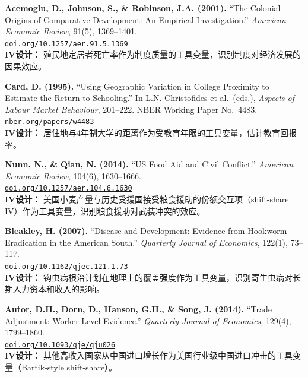 \documentclass[12pt, a4paper]{article}
\begin{document}
\begin{enumerate}[label=\textbf{[\arabic*]}, leftmargin=*, itemsep=1em]

\item \textbf{Acemoglu, D., Johnson, S., \& Robinson, J.A. (2001).}
  ``The Colonial Origins of Comparative Development: An Empirical Investigation.''
  \emph{American Economic Review}, 91(5), 1369--1401.\\
  \href{https://doi.org/10.1257/aer.91.5.1369}{\texttt{doi.org/10.1257/aer.91.5.1369}}\\
  {\small \textcolor{asher}{\textbf{IV设计：} 殖民地定居者死亡率作为制度质量的工具变量，识别制度对经济发展的因果效应。}}

\item \textbf{Card, D. (1995).}
  ``Using Geographic Variation in College Proximity to Estimate the Return to Schooling.''
  In L.N. Christofides et al.\ (eds.), \emph{Aspects of Labour Market Behaviour}, 201--222.
  NBER Working Paper No.\ 4483.\\
  \href{https://www.nber.org/papers/w4483}{\texttt{nber.org/papers/w4483}}\\
  {\small \textcolor{asher}{\textbf{IV设计：} 居住地与4年制大学的距离作为受教育年限的工具变量，估计教育回报率。}}

\item \textbf{Nunn, N., \& Qian, N. (2014).}
  ``US Food Aid and Civil Conflict.''
  \emph{American Economic Review}, 104(6), 1630--1666.\\
  \href{https://doi.org/10.1257/aer.104.6.1630}{\texttt{doi.org/10.1257/aer.104.6.1630}}\\
  {\small \textcolor{asher}{\textbf{IV设计：} 美国小麦产量与历史受援国接受粮食援助的份额交互项（shift-share IV）作为工具变量，识别粮食援助对武装冲突的效应。}}

\item \textbf{Bleakley, H. (2007).}
  ``Disease and Development: Evidence from Hookworm Eradication in the American South.''
  \emph{Quarterly Journal of Economics}, 122(1), 73--117.\\
  \href{https://doi.org/10.1162/qjec.121.1.73}{\texttt{doi.org/10.1162/qjec.121.1.73}}\\
  {\small \textcolor{asher}{\textbf{IV设计：} 钩虫病根治计划在地理上的覆盖强度作为工具变量，识别寄生虫病对长期人力资本和收入的影响。}}

\item \textbf{Autor, D.H., Dorn, D., Hanson, G.H., \& Song, J. (2014).}
  ``Trade Adjustment: Worker-Level Evidence.''
  \emph{Quarterly Journal of Economics}, 129(4), 1799--1860.\\
  \href{https://doi.org/10.1093/qje/qju026}{\texttt{doi.org/10.1093/qje/qju026}}\\
  {\small \textcolor{asher}{\textbf{IV设计：} 其他高收入国家从中国进口增长作为美国行业级中国进口冲击的工具变量（Bartik-style shift-share）。}}


\end{enumerate}
\end{document}
